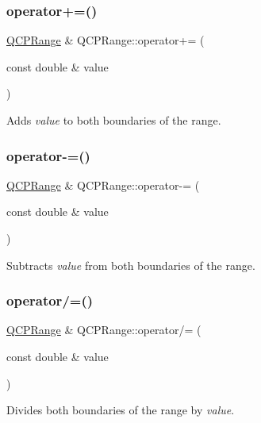 \subsubsection{\texorpdfstring{operator+=()}{operator+=()}}
{\footnotesize\ttfamily \hyperlink{class_q_c_p_range}{Q\+C\+P\+Range} \& Q\+C\+P\+Range\+::operator+= (\begin{DoxyParamCaption}\item[{const double \&}]{value }\end{DoxyParamCaption})\hspace{0.3cm}{\ttfamily [inline]}}

Adds {\itshape value} to both boundaries of the range. \mbox{\label{class_q_c_p_range_a95894bcb15a16a75ca564091374e2191}} 
\subsubsection{\texorpdfstring{operator-\/=()}{operator-=()}}
{\footnotesize\ttfamily \hyperlink{class_q_c_p_range}{Q\+C\+P\+Range} \& Q\+C\+P\+Range\+::operator-\/= (\begin{DoxyParamCaption}\item[{const double \&}]{value }\end{DoxyParamCaption})\hspace{0.3cm}{\ttfamily [inline]}}

Subtracts {\itshape value} from both boundaries of the range. \mbox{\label{class_q_c_p_range_a6137d8682b6835ace840730b4c1e2d63}} 
\subsubsection{\texorpdfstring{operator/=()}{operator/=()}}
{\footnotesize\ttfamily \hyperlink{class_q_c_p_range}{Q\+C\+P\+Range} \& Q\+C\+P\+Range\+::operator/= (\begin{DoxyParamCaption}\item[{const double \&}]{value }\end{DoxyParamCaption})\hspace{0.3cm}{\ttfamily [inline]}}

Divides both boundaries of the range by {\itshape value}. \mbox{\label{class_q_c_p_range_a9f8d1fdcf4b6d19779f1c3d9a14b09c9}} 

